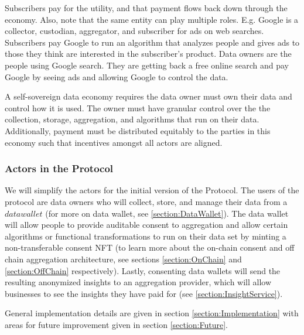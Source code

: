 Subscribers pay for the utility, and that payment flows back down through the economy. Also, note that the same entity can play multiple roles. E.g. Google 
is a collector, custodian, aggregator, and subscriber for ads on web searches. Subscribers pay Google to run an algorithm that analyzes people 
and gives ads to those they think are interested in the subscriber's product. Data owners are the people using Google search. They are getting back a free 
online search and pay Google by seeing ads and allowing Google to control the data.

A self-sovereign data economy requires the data owner must own their data and control how it is used. The owner must have granular control over the 
the collection, storage, aggregation, and algorithms that run on their data. Additionally, payment must be distributed equitably to the parties in this 
economy such that incentives amongst all actors are aligned.

\subsubsection{Actors in the Protocol}
We will simplify the actors for the initial version of the Protocol. The users of the protocol are data owners who will collect, store, 
and manage their data from a $\mathit{data wallet}$ (for more on data wallet, see \ref{section:DataWallet}). The data wallet will allow people to 
provide auditable consent to aggregation and allow certain algorithms or functional transformations to run on their data set by minting a non-transferable consent NFT 
(to learn more about the on-chain consent and off chain aggregation architecture, see sections \ref{section:OnChain} and \ref{section:OffChain} respectively). 
Lastly, consenting data wallets will send the resulting anonymized insights to an aggregation provider, which will allow businesses to see the insights they have paid 
for (see \ref{section:InsightService}). 

General implementation details are given in section \ref{section:Implementation} with areas for future improvement given in section \ref{section:Future}.

